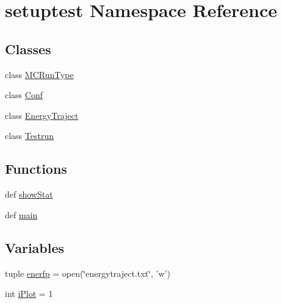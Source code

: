 \hypertarget{namespacesetuptest}{\section{setuptest Namespace Reference}
\label{namespacesetuptest}
}
\subsection*{Classes}
\begin{DoxyCompactItemize}
\item 
class \hyperlink{classsetuptest_1_1_m_c_run_type}{M\-C\-Run\-Type}
\item 
class \hyperlink{classsetuptest_1_1_conf}{Conf}
\item 
class \hyperlink{classsetuptest_1_1_energy_traject}{Energy\-Traject}
\item 
class \hyperlink{classsetuptest_1_1_testrun}{Testrun}
\end{DoxyCompactItemize}
\subsection*{Functions}
\begin{DoxyCompactItemize}
\item 
def \hyperlink{namespacesetuptest_af516d3e60e96fa382f8fbeabd15377d7}{show\-Stat}
\item 
def \hyperlink{namespacesetuptest_a581d97e501b0f16b5c87385814380beb}{main}
\end{DoxyCompactItemize}
\subsection*{Variables}
\begin{DoxyCompactItemize}
\item 
tuple \hyperlink{namespacesetuptest_ae1a88336efd04d5b26c3452bfdbe9bcf}{enerfp} = open(\char`\"{}energytraject.\-txt\char`\"{}, 'w')
\item 
int \hyperlink{namespacesetuptest_a141fc0b7e5f441f2fc4a25ac5a75eb93}{i\-Plot} = 1
\end{DoxyCompactItemize}


